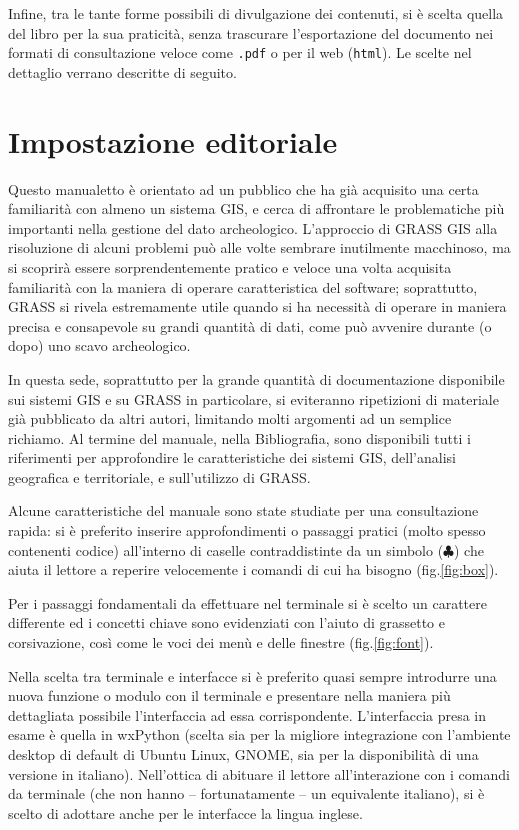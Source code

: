 \documentclass{article}
\begin{document}
\begin{multicols}{2}
			Infine, tra le tante forme possibili di divulgazione dei contenuti, si è scelta quella del libro per la sua praticità, senza trascurare l'esportazione del documento nei formati di consultazione veloce come \texttt{.pdf} o per il web (\texttt{html}). Le scelte nel dettaglio verrano descritte di seguito.
		
		\section{Impostazione editoriale}
			Questo manualetto è orientato ad un pubblico che ha già acquisito una certa familiarità con almeno un sistema GIS, e cerca di affrontare le problematiche più importanti nella gestione del dato archeologico. L'approccio di GRASS GIS alla risoluzione di alcuni problemi può alle volte sembrare inutilmente macchinoso, ma si scoprirà essere sorprendentemente pratico e veloce una volta acquisita familiarità con la maniera di operare caratteristica del software; soprattutto, GRASS si rivela estremamente utile quando si ha necessità di operare in maniera precisa e consapevole su grandi quantità di dati, come può avvenire durante (o dopo) uno scavo archeologico.

			In questa sede, soprattutto per la grande quantità di documentazione disponibile sui sistemi GIS e su GRASS in particolare, si eviteranno ripetizioni di materiale già pubblicato da altri autori, limitando molti argomenti ad un semplice richiamo. Al termine del manuale, nella Bibliografia, sono disponibili tutti i riferimenti per approfondire le caratteristiche dei sistemi GIS, dell'analisi geografica e territoriale, e sull'utilizzo di GRASS.

			Alcune caratteristiche del manuale sono state studiate per una consultazione rapida: si è preferito inserire approfondimenti o passaggi pratici (molto spesso contenenti codice) all'interno di caselle contraddistinte da un simbolo ($\clubsuit$) che aiuta il lettore a reperire velocemente i comandi di cui ha bisogno (fig.\ref{fig:box}).

			Per i passaggi fondamentali da effettuare nel terminale si è scelto un carattere differente ed i concetti chiave sono evidenziati con l'aiuto di grassetto e corsivazione, cos\`{i} come le voci dei menù e delle finestre (fig.\ref{fig:font}).

			Nella scelta tra terminale e interfacce si è preferito quasi sempre introdurre una nuova funzione o modulo con il terminale e presentare nella maniera più dettagliata possibile l'interfaccia ad essa corrispondente. L'interfaccia presa in esame è quella in wxPython (scelta sia per la migliore integrazione con l'ambiente desktop di default di Ubuntu Linux, GNOME, sia per la disponibilità di una versione in italiano). Nell'ottica di abituare il lettore all'interazione con i comandi da terminale (che non hanno -- fortunatamente -- un equivalente italiano), si è scelto di adottare anche per le interfacce la lingua inglese.


\end{multicols}
\end{document}
